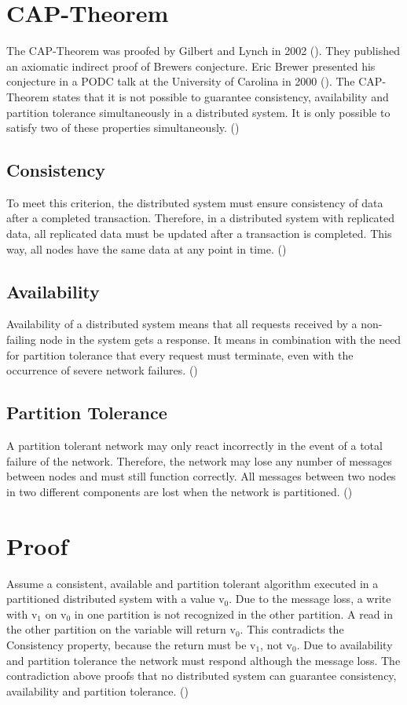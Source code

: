 \section*{CAP-Theorem}
The \ac{CAP}-Theorem was proofed by Gilbert and Lynch in 2002 (\cite{brewer:2002}). They published an axiomatic indirect proof of Brewers conjecture. Eric Brewer presented his conjecture in a \ac{PODC} talk at the University of Carolina in 2000 (\cite{brewer:2000}). The \ac{CAP}-Theorem states that it is not possible to guarantee consistency, availability and partition tolerance simultaneously in a distributed system. It is only possible to satisfy two of these properties simultaneously. (\cite[p.~1]{brewer:2002})
\subsection*{Consistency}
To meet this criterion, the distributed system must ensure consistency of data after a completed transaction. Therefore, in a distributed system with replicated data, all replicated data must be updated after a transaction is completed. This way, all nodes have the same data at any point in time. (\cite[p.~2ff.]{brewer:2002})
\subsection*{Availability}
Availability of a distributed system means that all requests received by a non-failing node in the system gets a response. It means in combination with the need for partition tolerance that every request must terminate, even with the occurrence of severe network failures. (\cite[p.~3]{brewer:2002})
\subsection*{Partition Tolerance}
A partition tolerant network may only react incorrectly in the event of a total failure of the network. Therefore, the network may lose any number of messages between nodes and must still function correctly. All messages between two nodes in two different components are lost when the network is partitioned. (\cite[p.~3ff.]{brewer:2002})
\pagebreak
\section*{Proof}
Assume a consistent, available and partition tolerant algorithm executed in a partitioned distributed system with a value v$_{0}$. Due to the message loss, a write with v$_{1}$ on v$_{0}$ in one partition is not recognized in the other partition. A read in the other partition on the variable will return v$_{0}$. This contradicts the Consistency property, because the return must be v$_{1}$, not v$_{0}$. Due to availability and partition tolerance the network must respond although the message loss. The contradiction above proofs that no distributed system can guarantee consistency, availability and partition tolerance. (\cite[p.~4ff.]{brewer:2002})
